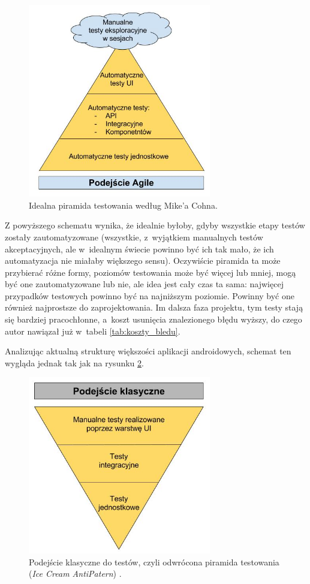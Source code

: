 \begin{figure}[!htb]
    \centering
    \includegraphics[width=8cm]{imgs/ch3_idealna_piramida.jpg}
    \caption
{Idealna piramida testowania według Mike'a Cohna\cite{bib:cohn:agile}.}
    \label{fig:idealna_piramida}
\end{figure} 

\newpage
Z powyższego schematu wynika, że idealnie byłoby, gdyby wszystkie etapy testów zostały zautomatyzowane (wszystkie, z~wyjątkiem manualnych testów akceptacyjnych, ale w~idealnym świecie powinno być ich tak mało, że ich automatyzacja nie miałaby większego sensu). Oczywiście piramida ta może przybierać różne formy, poziomów testowania może być więcej lub mniej, mogą być one zautomatyzowane lub nie, ale idea jest cały czas ta sama: najwięcej przypadków testowych powinno być na najniższym poziomie. Powinny być one również najprostsze do zaprojektowania. Im dalsza faza projektu, tym testy stają się bardziej pracochłonne, a~koszt usunięcia znalezionego błędu wyższy, do czego autor nawiązał już w~tabeli \ref{tab:koszty_bledu}.

Analizując aktualną strukturę większości aplikacji androidowych, schemat ten wygląda jednak tak jak na rysunku \ref{fig:odwrocona_piramida}.

\begin{figure}[!htb]
    \centering
    \includegraphics[width=8cm]{imgs/ch3_odwrocona_piramida.jpg}
    \caption
{Podejście klasyczne do testów, czyli odwrócona piramida testowania (\textit{Ice Cream AntiPatern}) \cite{website:piramidatestow}.}
    \label{fig:odwrocona_piramida}
\end{figure} 

